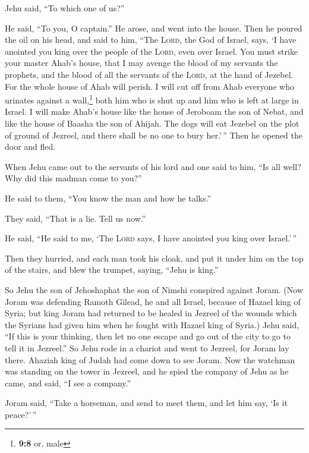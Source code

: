 Jehu said, ``To which one of us?''

He said, ``To you, O captain.''  He arose, and went into
the house. Then he poured the oil on his head, and said to him, ``The
\textsc{Lord}, the God of Israel, says, `I have anointed you king over
the people of the \textsc{Lord}, even over Israel.  You
must strike your master Ahab's house, that I may avenge the blood of my
servants the prophets, and the blood of all the servants of the
\textsc{Lord}, at the hand of Jezebel.  For the whole
house of Ahab will perish. I will cut off from Ahab everyone who
urinates against a wall,\footnote{\textbf{9:8} or, male} both him who is
shut up and him who is left at large in Israel.  I will
make Ahab's house like the house of Jeroboam the son of Nebat, and like
the house of Baasha the son of Ahijah.  The dogs will eat
Jezebel on the plot of ground of Jezreel, and there shall be no one to
bury her.'\,'' Then he opened the door and fled.

 When Jehu came out to the servants of his lord and one
said to him, ``Is all well? Why did this madman come to you?''

He said to them, ``You know the man and how he talks.''

 They said, ``That is a lie. Tell us now.''

He said, ``He said to me, `The \textsc{Lord} says, I have anointed you
king over Israel.'\,''

 Then they hurried, and each man took his cloak, and put
it under him on the top of the stairs, and blew the trumpet, saying,
``Jehu is king.''

 So Jehu the son of Jehoshaphat the son of Nimshi
conspired against Joram. (Now Joram was defending Ramoth Gilead, he and
all Israel, because of Hazael king of Syria;  but king
Joram had returned to be healed in Jezreel of the wounds which the
Syrians had given him when he fought with Hazael king of Syria.) Jehu
said, ``If this is your thinking, then let no one escape and go out of
the city to go to tell it in Jezreel.''  So Jehu rode in
a chariot and went to Jezreel, for Joram lay there. Ahaziah king of
Judah had come down to see Joram.  Now the watchman was
standing on the tower in Jezreel, and he spied the company of Jehu as he
came, and said, ``I see a company.''

Joram said, ``Take a horseman, and send to meet them, and let him say,
`Is it peace?'\,''

